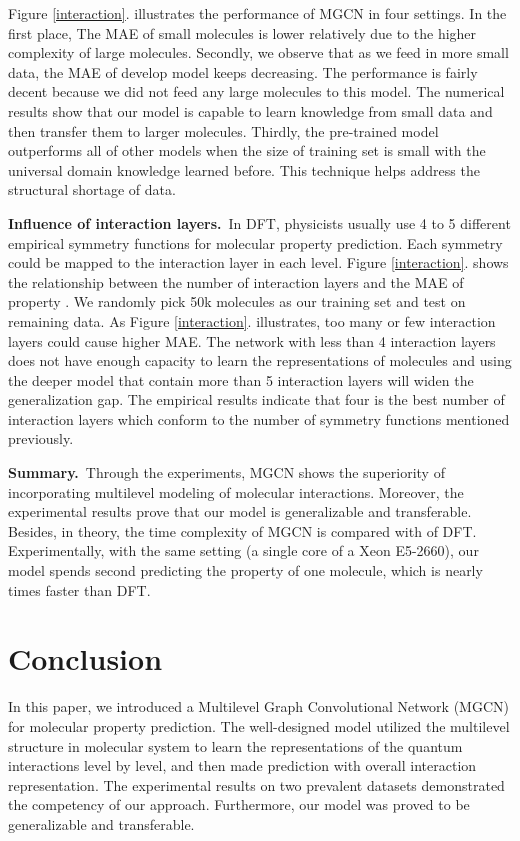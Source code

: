\documentclass[letterpaper]{article} \usepackage{bm}
\begin{document}
Figure \ref{interaction}. illustrates the performance of MGCN in four settings. In the first place, The MAE of small molecules is lower relatively due to the higher complexity of large molecules. Secondly, we observe that as we feed in more small data, the MAE of develop model keeps decreasing. The performance is fairly decent because we did not feed any large molecules to this model. The numerical results show that our model is capable to learn knowledge from small data and then transfer them to larger molecules. Thirdly, the pre-trained model outperforms all of other models when the size of training set is small with the universal domain knowledge learned before. This technique helps address the structural shortage of data.


\textbf{Influence of interaction layers.}\ In DFT, physicists usually use 4 to 5 different empirical symmetry functions for molecular property prediction. Each symmetry could be mapped to the interaction layer in each level. Figure \ref{interaction}. shows the relationship between the number of interaction layers and the MAE of property . We randomly pick 50k molecules as our training set and test on remaining data. As Figure \ref{interaction}. illustrates, too many or few interaction layers could cause higher MAE. The network with less than 4 interaction layers does not have enough capacity to learn the representations of molecules and using the deeper model that contain more than 5 interaction layers will widen the generalization gap. The empirical results indicate that four is the best number of interaction layers which conform to the number of symmetry functions mentioned previously. 

\textbf{Summary.}\ Through the experiments, MGCN shows the superiority of incorporating multilevel modeling of molecular interactions. Moreover, the experimental results prove that our model is generalizable and transferable. Besides, in theory, the time complexity of MGCN is  compared with  of DFT. Experimentally, with the same setting (a single core of a Xeon E5-2660), our model spends  second predicting the property of one molecule, which is nearly  times faster than DFT. 


 
\section{Conclusion}

In this paper, we introduced a Multilevel Graph Convolutional Network (MGCN) for molecular property prediction. The well-designed model utilized the multilevel structure in molecular system to learn the representations of the quantum interactions level by level, and then made prediction with overall interaction representation. The experimental results on two prevalent datasets demonstrated the competency of our approach. Furthermore, our model was proved to be generalizable and transferable.  
\end{document}

